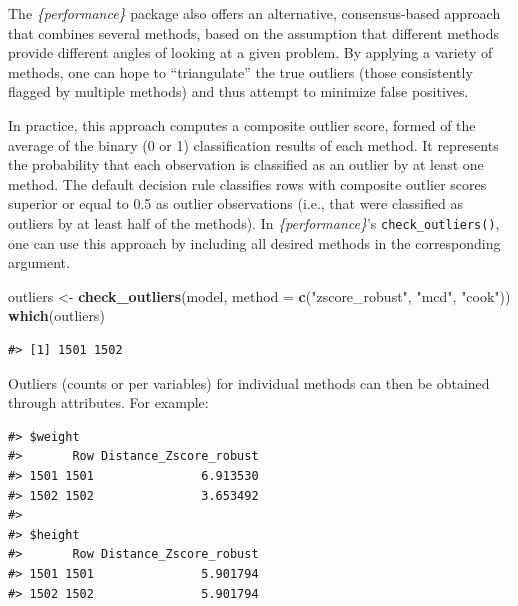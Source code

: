 \documentclass[sn-basic, lineno,pdflatex]{sn-jnl}
\newenvironment{Shaded}{\begin{snugshade}}{\end{snugshade}}
\newcommand{\AttributeTok}[1]{\textcolor[rgb]{0.13,0.29,0.53}{#1}}
\newcommand{\FunctionTok}[1]{\textcolor[rgb]{0.13,0.29,0.53}{\textbf{#1}}}
\newcommand{\NormalTok}[1]{#1}
\newcommand{\OtherTok}[1]{\textcolor[rgb]{0.56,0.35,0.01}{#1}}
\newcommand{\SpecialCharTok}[1]{\textcolor[rgb]{0.81,0.36,0.00}{\textbf{#1}}}
\newcommand{\StringTok}[1]{\textcolor[rgb]{0.31,0.60,0.02}{#1}}
\begin{document}
The \emph{\{performance\}} package also offers an alternative,
consensus-based approach that combines several methods, based on the
assumption that different methods provide different angles of looking at
a given problem. By applying a variety of methods, one can hope to
``triangulate'' the true outliers (those consistently flagged by
multiple methods) and thus attempt to minimize false positives.

In practice, this approach computes a composite outlier score, formed of
the average of the binary (0 or 1) classification results of each
method. It represents the probability that each observation is
classified as an outlier by at least one method. The default decision
rule classifies rows with composite outlier scores superior or equal to
0.5 as outlier observations (i.e., that were classified as outliers by
at least half of the methods). In \emph{\{performance\}}'s
\texttt{check\_outliers()}, one can use this approach by including all
desired methods in the corresponding argument.

\begin{Shaded}
\begin{Highlighting}[]
\NormalTok{outliers }\OtherTok{\textless{}{-}} \FunctionTok{check\_outliers}\NormalTok{(model, }\AttributeTok{method =} \FunctionTok{c}\NormalTok{(}\StringTok{"zscore\_robust"}\NormalTok{, }\StringTok{"mcd"}\NormalTok{, }\StringTok{"cook"}\NormalTok{))}
\FunctionTok{which}\NormalTok{(outliers)}
\end{Highlighting}
\end{Shaded}

\begin{verbatim}
#> [1] 1501 1502
\end{verbatim}

Outliers (counts or per variables) for individual methods can then be
obtained through attributes. For example:

\begin{Shaded}
\end{Shaded}

\begin{verbatim}
#> $weight
#>       Row Distance_Zscore_robust
#> 1501 1501               6.913530
#> 1502 1502               3.653492
#> 
#> $height
#>       Row Distance_Zscore_robust
#> 1501 1501               5.901794
#> 1502 1502               5.901794
\end{verbatim}
\end{document}
